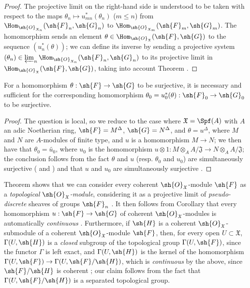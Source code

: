\begin{proof}
The projective limit on the right-hand side is understood to be taken with respect to the maps $\theta_n\mapsto u_{mn}^*(\theta_n)$ ($m\leq n$) from $\Hom_{\sh{O}_{X_n}}(\sh{F}_n,\sh{G}_n)$ to $\Hom_{\sh{O}_{X_m}}(\sh{F}_m,\sh{G}_m)$.
The homomorphism  sends an element $\theta\in\Hom_{\sh{O}_\mathfrak{X}}(\sh{F},\sh{G})$ to the sequence $(u_n^*(\theta))$; we can define its inverse by sending a projective system $(\theta_n)\in\varprojlim_n\Hom_{\sh{O}_{X_n}}(\sh{F}_n,\sh{G}_n)$ to its projective limit in $\Hom_{\sh{O}_\mathfrak{X}}(\sh{F},\sh{G})$, taking into account Theorem .
\end{proof}

\begin{corollary}[10.11.5]
\label{I.10.11.5}
For a homomorphism $\theta:\sh{F}\to\sh{G}$ to be surjective, it is necessary and sufficient for the corresponding homomorphism $\theta_0=u_0^*(\theta):\sh{F}_0\to\sh{G}_0$ to be surjective.
\end{corollary}

\begin{proof}
The question is local, so we reduce to the case where $\mathfrak{X}=\Spf(A)$ with $A$ an adic Noetherian ring, $\sh{F}=M^\Delta$, $\sh{G}=N^\Delta$, and $\theta=u^\Delta$, where $M$ and $N$ are $A$-modules of finite type, and $u$ is a homomorphism $M\to N$; we then have that $\theta_0=\widetilde{u_0}$, where $u_0$ is the homomorphism $u\otimes 1:M\otimes_A A/\mathfrak{J}\to N\otimes_A A/\mathfrak{J}$; the conclusion follows from the fact $\theta$ and $u$ (resp. $\theta_0$ and $u_0$) are simultaneously surjective ( and ) and that $u$ and $u_0$ are simultaneously surjective .
\end{proof}

\begin{env}[10.11.6]
\label{I.10.11.6}
Theorem  shows that we can consider every coherent $\sh{O}_\mathfrak{X}$-module $\sh{F}$ as a \emph{topological $\sh{O}_\mathfrak{X}$-module}, considering it as a projective limit of \emph{pseudo-discrete} sheaves of groups $\sh{F}_n$ .
It then follows from Corollary  that every homomorphism $u:\sh{F}\to\sh{G}$ of coherent $\sh{O}_\mathfrak{X}$-modules is automatically \emph{continuous}
.
Furthermore, if $\sh{H}$ is a coherent $\sh{O}_\mathfrak{X}$-submodule of a coherent $\sh{O}_\mathfrak{X}$-module $\sh{F}$, then, for every open $U\subset\mathfrak{X}$, $\Gamma(U,\sh{H})$ is a \emph{closed} subgroup of the topological group $\Gamma(U,\sh{F})$, since the functor $\Gamma$ is left exact, and $\Gamma(U,\sh{H})$ is the kernel of the homomorphism $\Gamma(U,\sh{F})\to\Gamma(U,\sh{F}/\sh{H})$, which is \emph{continuous} by the above, since $\sh{F}/\sh{H}$ is coherent ; our claim follows from the fact that $\Gamma(U,\sh{F}/\sh{H})$ is a separated topological group.
\end{env}

